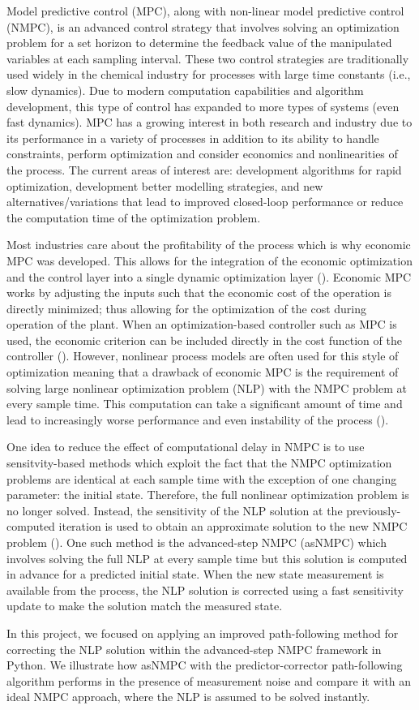 Model predictive control (MPC), along with non-linear model predictive control (NMPC), is an advanced control strategy that involves solving an optimization problem for a set horizon to determine the feedback value of the manipulated variables at each sampling interval.
These two control strategies are traditionally used widely in the chemical industry for processes with large time constants (i.e., slow dynamics).
Due to modern computation capabilities and algorithm development, this type of control has expanded to more types of systems (even fast dynamics).
MPC has a growing interest in both research and industry due to its performance in a variety of processes in addition to its ability to handle constraints, perform optimization and consider economics and nonlinearities of the process.
The current areas of interest are: development algorithms for rapid optimization, development better modelling strategies, and new alternatives/variations that lead to improved closed-loop performance or reduce the computation time of the optimization problem.
\par
Most industries care about the profitability of the process which is why economic MPC was developed.
This allows for the integration of the economic optimization and the control layer into a single dynamic optimization layer (\cite{economic}).
Economic MPC works by adjusting the inputs such that the economic cost of the operation is directly minimized; thus allowing for the optimization of the cost during operation of the plant.
When an optimization-based controller such as MPC is used, the economic criterion can be included directly in the cost function of the controller (\cite{fast}).
However, nonlinear process models are often used for this style of optimization meaning that a drawback of economic MPC is the requirement of solving large nonlinear optimization problem (NLP) with the NMPC problem at every sample time.
This computation can take a significant amount of time and lead to increasingly worse performance and even instability of the process (\cite{economic}).
\par
One idea to reduce the effect of computational delay in NMPC is to use sensitvity-based methods which exploit the fact that the NMPC optimization problems are identical at each sample time with the exception of one changing parameter: the initial state.
Therefore, the full nonlinear optimization problem is no longer solved.
Instead, the sensitivity of the NLP solution at the previously-computed iteration is used to obtain an approximate solution to the new NMPC problem (\cite{economic}).
One such method is the advanced-step NMPC (asNMPC) which involves solving the full NLP at every sample time but this solution is computed in advance for a predicted initial state.
When the new state measurement is available from the process, the NLP solution is corrected using a fast sensitivity update to make the solution match the measured state.
\par
In this project, we focused on applying an improved path-following method for correcting the NLP solution within the advanced-step NMPC framework in Python. 
We illustrate how asNMPC with the predictor-corrector path-following algorithm performs in the presence of measurement noise and compare it with an ideal NMPC approach, where the NLP is assumed to be solved instantly.